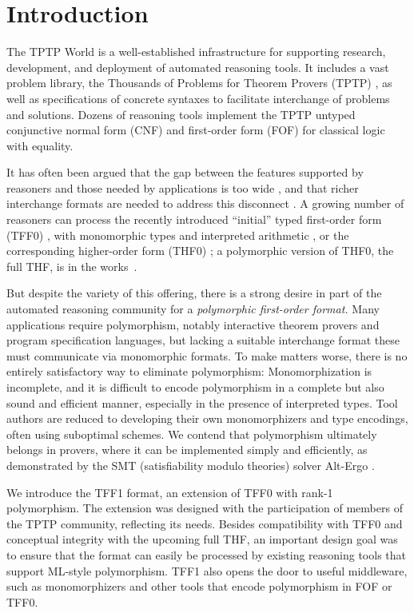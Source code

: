 \section{Introduction}
\label{sec_intro}

The TPTP World \cite{sutcliffe-2010-world} is a well-established infrastructure
for supporting research, development, and deployment of automated reasoning
tools. It includes a vast problem library, the Thousands of Problems for Theorem
Provers (TPTP) \cite{sutcliffe-2009-lib}, as well as specifications of concrete
syntaxes to facilitate interchange of problems and solutions.
Dozens of reasoning tools implement the TPTP untyped conjunctive normal form
(CNF) and first-order form (FOF) for classical logic with equality.

It has often been argued that the gap between the features supported by
reasoners and those needed by applications is too wide
\cite{schumann-2001,stickel-2009,voronkov-2003}, and that richer interchange formats are
needed to address this disconnect \cite{kuncak-2011}.
A growing number of reasoners can process the
recently introduced ``initial'' typed first-order form (TFF0) \cite{sutcliffe-et-al-2012-tff0},
with monomorphic types and interpreted arithmetic \cite{SPASS-T,vampire-arith},
or the corresponding higher-order form (THF0) \cite{benzmueller-et-al-2008-thf0};
a polymorphic version of THF0, the full THF, is in the works~\cite{sutcliffe-benzmueller-2010}.

But despite the variety of this offering, there is a strong desire in part of the automated
reasoning community for a \emph{polymorphic first-order format.} Many applications
require polymorphism, notably interactive theorem provers and program
specification languages, but lacking a suitable interchange format these
must communicate via monomorphic formats. To make matters worse, there is no entirely
satisfactory way to eliminate polymorphism: Monomorphization is %
incomplete, and it is difficult to encode polymorphism in a complete but
also sound and efficient manner, especially in the presence of interpreted types. Tool authors
are reduced to developing their own monomorphizers and type encodings, often
using suboptimal schemes. We contend that polymorphism ultimately belongs in
provers, where it can be implemented simply and efficiently, as demonstrated by
the SMT (satisfiability modulo theories) solver Alt-Ergo \cite{bobot-et-al-2008}.

We introduce the TFF1
format, an extension of TFF0 with rank-1 polymorphism. The
extension was designed with the participation of members of the TPTP community,
reflecting its needs.
Besides compatibility with TFF0 and conceptual integrity with the upcoming full
THF, an important design goal was to ensure that the format can easily be
processed by existing reasoning tools that support ML-style polymorphism. TFF1
also opens the door to useful middleware, such as monomorphizers and other
tools that encode polymorphism in FOF or TFF0.

